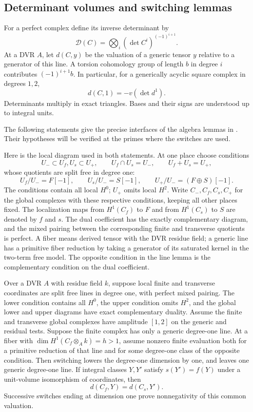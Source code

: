 \subsection{Determinant volumes and switching lemmas}

For a perfect complex define its inverse determinant by
\[
 \mathcal D(C)=\bigotimes_i(\det C^i)^{(-1)^{i+1}}.
\]
At a DVR $A$, let $d(C,y)$ be the valuation of a generic tensor $y$
relative to a generator of this line.  A torsion cohomology group of
length $b$ in degree $i$ contributes $(-1)^{i+1}b$.  In particular, for
a generically acyclic square complex in degrees $1,2$,
\begin{equation}\label{models:determinant-sign}
 d(C,1)=-v(\det d^1).
\end{equation}
Determinants multiply in exact triangles.  Bases and their signs are
understood up to integral units.

The following statements give the precise interfaces of the algebra
lemmas in \cite[Lemmas 3.5 and 3.6]{B}.  Their hypotheses will be verified
at the primes where the switches are used.

Here is the local diagram used in both statements.  At one place
choose conditions
\[
 U_-\subset U_f,U_s\subset U_+,
 \qquad U_f\cap U_s=U_-,\qquad U_f+U_s=U_+,
\]
whose quotients are split free in degree one:
\[
 U_f/U_-=F[-1],\qquad U_s/U_-=S[-1],\qquad
 U_+/U_-=(F\oplus S)[-1].
\]
The conditions contain all local $H^0$; $U_+$ omits local $H^2$.
Write
$C_-,C_f,C_s,C_+$ for the global complexes with these respective
conditions, keeping all other places fixed.  The localization
maps from $H^1(C_f)$ to $F$ and from $H^1(C_s)$ to $S$ are denoted
by $f$ and $s$.  The dual coefficient has the exactly complementary
diagram, and the mixed pairing between the corresponding finite
and transverse quotients is perfect.  A fiber means derived
tensor with the DVR residue field; a generic line has a primitive
fiber reduction by taking a generator of its saturated kernel in
the two-term free model.  The opposite condition in the line
lemma is the complementary condition on the dual coefficient.

\begin{lemma}\label{models:line-switch}
Over a DVR $A$ with residue field $k$, suppose local finite and transverse coordinates are split
free lines in degree one, with perfect mixed pairing.  The lower
condition contains all $H^0$, the upper condition omits $H^2$, and the
global lower and upper diagrams have exact complementary duality.
Assume the finite and transverse global complexes have amplitude
$[1,2]$ on the generic and residual tests.  Suppose the finite complex
has only a generic degree-one line.  At a fiber with
$\dim H^1(C_f\otimes_A k)=h>1$,
assume nonzero finite evaluation both for a primitive reduction of
that line and for some degree-one class of the opposite condition.
Then switching lowers the degree-one dimension by one, and leaves one
generic degree-one line.  If integral classes $Y,Y'$ satisfy
$s(Y')=f(Y)$ under a unit-volume isomorphism of coordinates, then
\[
 d(C_f,Y)=d(C_s,Y').
\]
Successive switches ending at dimension one prove nonnegativity of
this common valuation.
\end{lemma}

